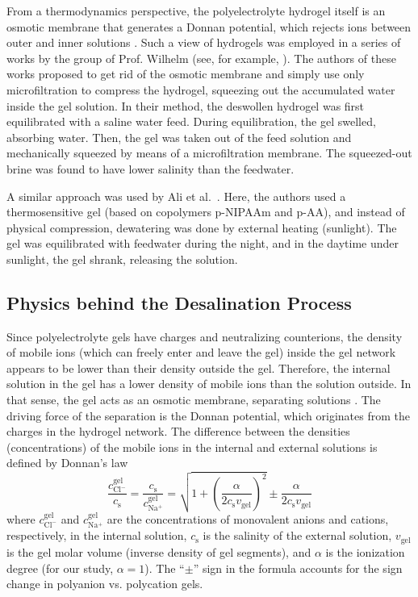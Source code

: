 \documentclass[gels,article,accept,pdftex,moreauthors]{Definitions/mdpi}
\newcommand{\cna}{c_\mathrm{Na^+}}
\newcommand{\ccl}{c_\mathrm{Cl^-}}
\newcommand{\gel}{^\mathrm{gel}}
\newcommand{\cs}{c_{\mathrm{s}}}
\newcommand{\vgel}{v_\mathrm{gel}}
\newcommand{\etal}{{et al.}{}}
\begin{document}
From a thermodynamics perspective, the polyelectrolyte hydrogel itself is an osmotic membrane that generates a Donnan potential, which rejects ions between outer and inner solutions \cite{Wang_2014}.
Such a view of hydrogels was employed in a series of works by the group of Prof. Wilhelm (see, for example, \cite{Arens_2017,Fengler_2020}).
The authors of these works proposed to get rid of the osmotic membrane and simply use only microfiltration to compress the hydrogel, squeezing out the accumulated water  %
inside the gel solution.
In their method, the deswollen hydrogel was first equilibrated with a saline water feed.
During equilibration, the gel swelled, absorbing water.
Then, the gel was taken out of the feed solution and mechanically squeezed by means of a microfiltration membrane.
The squeezed-out brine was found to have lower salinity than the feedwater.

A similar approach was used by Ali \etal~\cite{Ali2015}.
Here, the authors used a thermosensitive gel (based on copolymers p-NIPAAm and p-AA), and instead of physical compression, dewatering was done by external heating (sunlight).
The gel was equilibrated with feedwater during the night, and in the daytime under sunlight, the gel shrank, releasing the solution.

\subsection{Physics behind the Desalination Process}
Since polyelectrolyte gels have charges and neutralizing counterions, the density of mobile ions (which can freely enter and leave the gel) inside the gel network appears to be lower than their density outside the gel.
Therefore, the internal solution in the gel has a lower density of mobile ions than the solution outside.
In that sense, the gel acts as an osmotic membrane, separating solutions \cite{Rud2020}.
The driving force of the separation is the Donnan potential, which originates from the charges in the hydrogel network.
The difference between the densities (concentrations) of the mobile ions in the internal and external solutions
is defined by Donnan's law \cite{Rud2018}
\begin{equation}
\frac{\ccl\gel}{\cs}=\frac{\cs}{\cna\gel}=\sqrt{1+\left(\frac{\alpha}{2\cs\vgel}\right)^{2}}\pm\frac{\alpha}{2\cs\vgel}
\end{equation}
where $\ccl\gel$ and $\cna\gel$ are the concentrations of monovalent anions and cations, respectively, %
 in the internal solution,
$\cs$ is the salinity of the external solution, $\vgel$ is the gel molar volume (inverse density of gel segments),
and $\alpha$ is the ionization degree (for our study, $\alpha=1$).
The ``$\pm$'' sign in the formula accounts for the sign change in polyanion vs. polycation gels.
\end{document}
